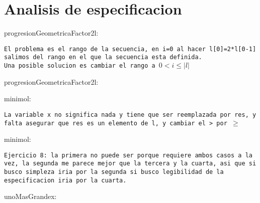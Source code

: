 \documentclass[10pt,a4paper]{article}
\begin{document}
\section*{Analisis de especificacion}
\begin{proc}{progresionGeometricaFactor2}{\In l: \TLista{\ent}}{\bool}
    \requiere{\True}
\end{proc}
\salto{\baselineskip}
\texttt{\color{red}El problema es el rango de la secuencia, en i=0 al hacer l[0]=2*l[0-1] salimos del rango en el que la secuencia esta definida.\\
Una posible solucion es cambiar el rango a $0<i\leq |l|$}\\
\begin{proc}{progresionGeometricaFactor2}{\In l: \TLista{\ent}}{\bool}
    \requiere{\True}
\end{proc}
\begin{proc}{minimo}{\In l: \TLista{\ent}}{\ent}
    \requiere{\True}
\end{proc}
\salto{\baselineskip}
\texttt{\color{red}La variable x no significa nada y tiene que ser reemplazada por res, y falta asegurar que res es un elemento de l, y cambiar el > por $\geq$}\\
\begin{proc}{minimo}{\In l: \TLista{\ent}}{\ent}
    \requiere{\True}
\end{proc}
\texttt{\color{blue}Ejercicio 8: la primera no puede ser porque requiere ambos casos a la vez, la segunda me parece mejor que la tercera y la cuarta, asi que si busco simpleza iria por la segunda si busco legibilidad de la especificacion iria por la cuarta.}
\begin{proc}{unoMasGrande}{\In x: \float}{\float}
    \requiere{\True}
\end{proc}
\end{document}
